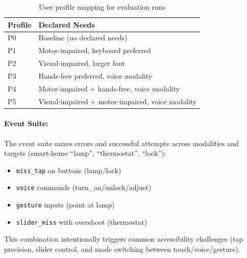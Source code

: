 \documentclass[openany]{book}
\begin{document}
\begin{table}[h]
\centering
\caption{User profile mapping for evaluation runs}
\begin{tabular}{ll}
\toprule
\textbf{Profile} & \textbf{Declared Needs} \\
\midrule
P0 & Baseline (no declared needs) \\
P1 & Motor-impaired, keyboard preferred \\
P2 & Visual-impaired, larger font \\
P3 & Hands-free preferred, voice modality \\
P4 & Motor-impaired + hands-free, voice modality \\
P5 & Visual-impaired + motor-impaired, voice modality \\
\bottomrule
\end{tabular}
\label{tab:user-profile-mapping}
\end{table}

\paragraph{Event Suite:}
The event suite mixes errors and successful attempts across modalities and targets (smart-home “lamp”, “thermostat”, “lock”):
\begin{itemize}
    \item \texttt{miss\_tap} on buttons (lamp/lock)
    \item \texttt{voice} commands (turn\_on/unlock/adjust)
    \item \texttt{gesture} inputs (point at lamp)
    \item \texttt{slider\_miss} with overshoot (thermostat)
\end{itemize}
This combination intentionally triggers common accessibility challenges (tap precision, slider control, and mode switching between touch/voice/gesture).
\end{document}
